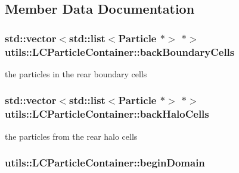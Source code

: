 \subsection{Member Data Documentation}
\hypertarget{classutils_1_1LCParticleContainer_aa1d24a4021ccf410d2a54edb8f8c38d6}{
\subsubsection[{back\-Boundary\-Cells}]{\setlength{\rightskip}{0pt plus 5cm}std\-::vector$<$std\-::list$<${\bf Particle} $\ast$$>$ $\ast$$>$ utils\-::\-L\-C\-Particle\-Container\-::back\-Boundary\-Cells\hspace{0.3cm}{\ttfamily [private]}}}\label{classutils_1_1LCParticleContainer_aa1d24a4021ccf410d2a54edb8f8c38d6}
the particles in the rear boundary cells \hypertarget{classutils_1_1LCParticleContainer_a0a2c5e53ceca2200e6d18ef4ea738232}{
\subsubsection[{back\-Halo\-Cells}]{\setlength{\rightskip}{0pt plus 5cm}std\-::vector$<$std\-::list$<${\bf Particle} $\ast$$>$ $\ast$$>$ utils\-::\-L\-C\-Particle\-Container\-::back\-Halo\-Cells\hspace{0.3cm}{\ttfamily [private]}}}\label{classutils_1_1LCParticleContainer_a0a2c5e53ceca2200e6d18ef4ea738232}
the particles from the rear halo cells \hypertarget{classutils_1_1LCParticleContainer_a419381c67176cc0ad6618a0a882c414e}{
\subsubsection[{begin\-Domain}]{ utils\-::\-L\-C\-Particle\-Container\-::begin\-Domain\hspace{0.3cm}{\ttfamily [private]}}}\label{classutils_1_1LCParticleContainer_a419381c67176cc0ad6618a0a882c414e}
